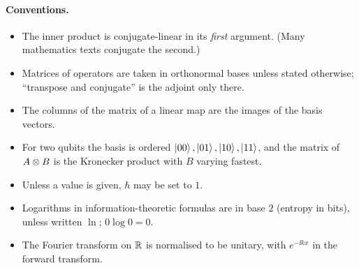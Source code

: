 \paragraph{Conventions.}
\begin{itemize}
  \item The inner product is conjugate-linear in its \emph{first} argument. (Many mathematics texts conjugate the second.)
  \item Matrices of operators are taken in orthonormal bases unless stated otherwise; ``transpose and conjugate'' is the adjoint only there.
  \item The columns of the matrix of a linear map are the images of the basis vectors.
  \item For two qubits the basis is ordered $\left|00\right\rangle,\left|01\right\rangle,\left|10\right\rangle,\left|11\right\rangle$, and the matrix of $A\otimes B$ is the Kronecker product with $B$ varying fastest.
  \item Unless a value is given, $\hbar$ may be set to $1$.
  \item Logarithms in information-theoretic formulas are in base $2$ (entropy in bits), unless written $\ln$; $0\log0=0$.
  \item The Fourier transform on $\mathbb{R}$ is normalised to be unitary, with $e^{-\ii kx}$ in the forward transform.
\end{itemize}
